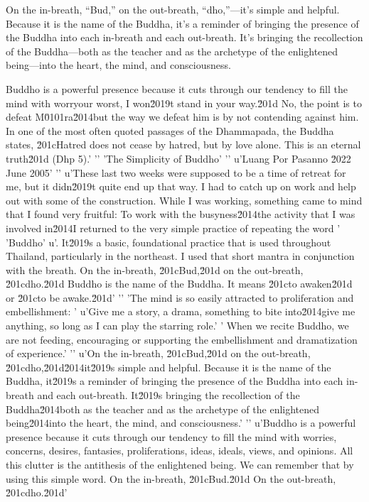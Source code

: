 On the in-breath, ``Bud,'' on the out-breath, ``dho,''---it's simple 
and helpful. Because it is the name of the Buddha, it's a reminder of 
bringing the presence of the Buddha into each in-breath and each 
out-breath. It's bringing the recollection of the Buddha---both as the 
teacher and as the archetype of the enlightened being---into the heart, 
the mind, and consciousness.

Buddho is a powerful presence because it cuts through our tendency to 
fill the mind with worryour worst, I won\u2019t stand in your way.\u201d No, the point is to defeat M\u0101ra\u2014but the way we defeat him is by not contending against him. In one of the most often quoted passages of the Dhammapada, the Buddha states, \u201cHatred does not cease by hatred, but by love alone. This is an eternal truth\u201d (Dhp 5).'
'\n'
'The Simplicity of Buddho'
'\n'
u'Luang Por Pasanno \u2022 June 2005'
'\n'
u'These last two weeks were supposed to be a time of retreat for me, but it didn\u2019t quite end up that way. I had to catch up on work and help out with some of the construction. While I was working, something came to mind that I found very fruitful: To work with the busyness\u2014the activity that I was involved in\u2014I returned to the very simple practice of repeating the word '
'Buddho'
u'. It\u2019s a basic, foundational practice that is used throughout Thailand, particularly in the northeast. I used that short mantra in conjunction with the breath. On the in-breath, \u201cBud,\u201d on the out-breath, \u201cdho.\u201d Buddho is the name of the Buddha. It means \u201cto awaken\u201d or \u201cto be awake.\u201d'
'\n'
'The mind is so easily attracted to proliferation and embellishment: '
u'Give me a story, a drama, something to bite into\u2014give me anything, so long as I can play the starring role.'
' When we recite Buddho, we are not feeding, encouraging or supporting the embellishment and dramatization of experience.'
'\n'
u'On the in-breath, \u201cBud,\u201d on the out-breath, \u201cdho,\u201d\u2014it\u2019s simple and helpful. Because it is the name of the Buddha, it\u2019s a reminder of bringing the presence of the Buddha into each in-breath and each out-breath. It\u2019s bringing the recollection of the Buddha\u2014both as the teacher and as the archetype of the enlightened being\u2014into the heart, the mind, and consciousness.'
'\n'
u'Buddho is a powerful presence because it cuts through our tendency to fill the mind with worries, concerns, desires, fantasies, proliferations, ideas, ideals, views, and opinions. All this clutter is the antithesis of the enlightened being. We can remember that by using this simple word. On the in-breath, \u201cBud.\u201d On the out-breath, \u201cdho.\u201d'
